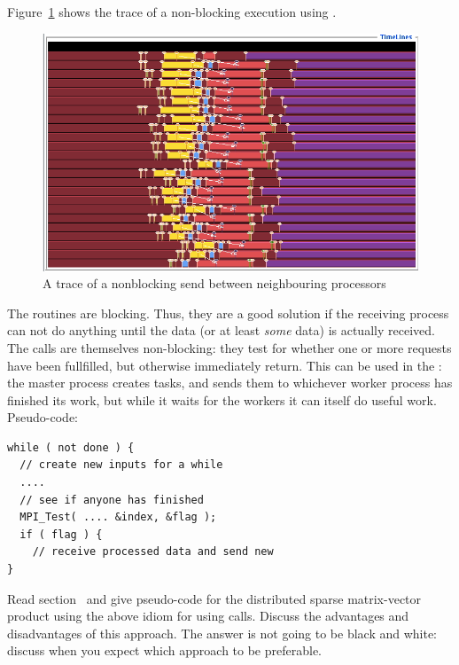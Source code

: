 Figure~\ref{fig:jump-nonblock} shows the trace of a non-blocking execution
using .
\begin{figure}[ht]
\includegraphics[scale=.4]{graphics/linear-nonblock}
\caption{A trace of a nonblocking send between neighbouring processors}
\label{fig:jump-nonblock}
\end{figure}

The  routines are blocking. Thus, they are a good solution if 
the receiving process can not do anything until the data 
(or at least \emph{some} data) is actually received.
The  calls are themselves non-blocking: they
test for whether one or more requests have been
fullfilled, but otherwise immediately return.
This can be used in the
: the master process creates tasks, and
sends them to whichever worker process has finished its work,
but while it waits for the workers it can itself do useful work.
Pseudo-code:
\begin{verbatim}
while ( not done ) {
  // create new inputs for a while
  ....
  // see if anyone has finished
  MPI_Test( .... &index, &flag );
  if ( flag ) {
    // receive processed data and send new
}
\end{verbatim}

\begin{exercise}
  Read section~ and give pseudo-code for the
    distributed sparse matrix-vector product using the above idiom for
    using  calls. Discuss the advantages and
    disadvantages of this approach. The answer is not going to be
    black and white: discuss when you expect which approach to be
    preferable.
\end{exercise}

